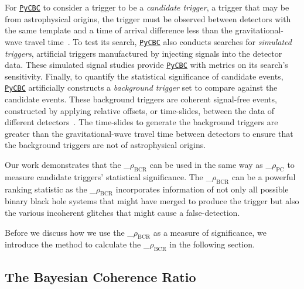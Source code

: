 \documentclass[%
 nofootinbib,
 amsmath,amssymb,
 aps,
 twocolumn
]{revtex4-2}
\newcommand{\pycbc}{{\sc \href{https://pycbc.org/}{\texttt{PyCBC}}}\xspace}
\newcommand{\mathcmd}[1]{{\sc \relax\ifmmode#1\else $#1$\fi}\xspace}
\newcommand{\bcr}{\mathcmd{\rho_\text{BCR}}}
\newcommand{\pycbcstat}{\mathcmd{\rho_\text{PC}}}
\begin{document}
For \pycbc to consider a trigger to be a \textit{candidate trigger}, a trigger that may be from astrophysical origins, the trigger must be observed between detectors with the same template and a time of arrival difference less than the gravitational-wave travel time~\cite{pycbc_og1}. To test its search, \pycbc also conducts searches for \textit{simulated triggers}, artificial triggers manufactured by injecting signals into the detector data. These simulated signal studies provide \pycbc with metrics on its search's sensitivity. Finally, to quantify the statistical significance of candidate events, \pycbc artificially constructs a \textit{background trigger} set to compare against the candidate events. These background triggers are coherent signal-free events, constructed by applying relative offsets, or time-slides, between the data of different detectors~\cite{pycbc_og6}. The time-slides to generate the background triggers are greater than the gravitational-wave travel time between detectors to ensure that the background triggers are not of astrophysical origins. 

Our work demonstrates that the \bcr can be used in the same way as \pycbcstat to measure candidate triggers' statistical significance.  The \bcr can be a powerful ranking statistic as the \bcr incorporates information of not only all possible binary black hole systems that might have merged to produce the trigger but also the various incoherent glitches that might cause a false-detection. 

Before we discuss how we use the \bcr as a measure of significance, we introduce the method to calculate the \bcr in the following section.


\subsection{The Bayesian Coherence Ratio}
\end{document}
